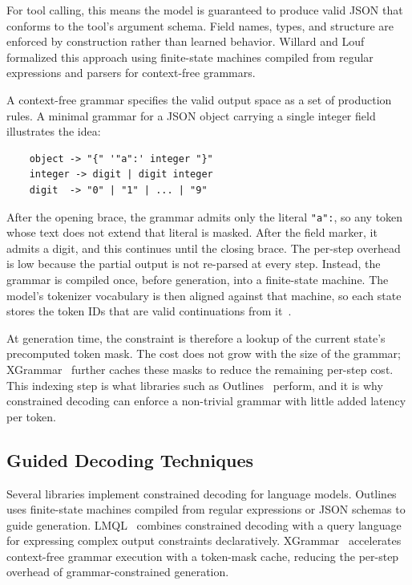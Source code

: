 For tool calling, this means the model is guaranteed to produce valid JSON that conforms to the tool's argument schema. Field names, types, and structure are enforced by construction rather than learned behavior. Willard and Louf~\cite{willard2023efficient} formalized this approach using finite-state machines compiled from regular expressions and parsers for context-free grammars.

A context-free grammar specifies the valid output space as a set of production rules. A minimal grammar for a JSON object carrying a single integer field illustrates the idea:

\begin{verbatim}
    object -> "{" '"a":' integer "}"
    integer -> digit | digit integer
    digit  -> "0" | "1" | ... | "9"
\end{verbatim}

\noindent After the opening brace, the grammar admits only the literal \texttt{"a":}, so any token whose text does not extend that literal is masked. After the field marker, it admits a digit, and this continues until the closing brace. The per-step overhead is low because the partial output is not re-parsed at every step. Instead, the grammar is compiled once, before generation, into a finite-state machine. The model's tokenizer vocabulary is then aligned against that machine, so each state stores the token IDs that are valid continuations from it~\cite{willard2023efficient}.

At generation time, the constraint is therefore a lookup of the current state's precomputed token mask. The cost does not grow with the size of the grammar; XGrammar~\cite{dong2024xgrammar} further caches these masks to reduce the remaining per-step cost. This indexing step is what libraries such as Outlines~\cite{outlines2024} perform, and it is why constrained decoding can enforce a non-trivial grammar with little added latency per token.

\subsection{Guided Decoding Techniques}

Several libraries implement constrained decoding for language models. Outlines~\cite{outlines2024} uses finite-state machines compiled from regular expressions or JSON schemas to guide generation. LMQL~\cite{beurer2023lmql} combines constrained decoding with a query language for expressing complex output constraints declaratively. XGrammar~\cite{dong2024xgrammar} accelerates context-free grammar execution with a token-mask cache, reducing the per-step overhead of grammar-constrained generation.

